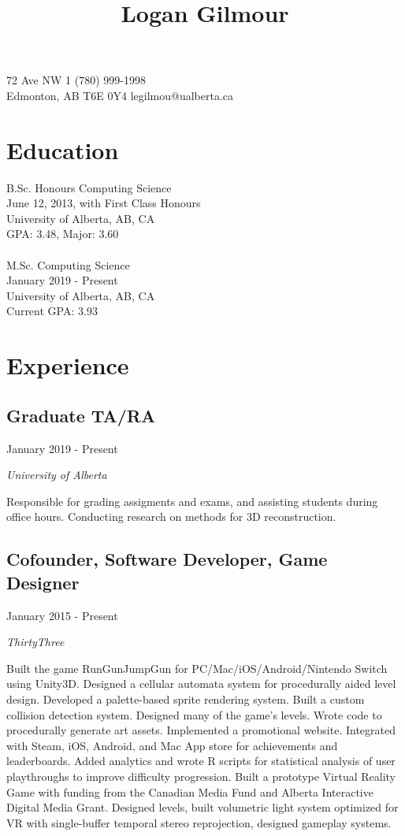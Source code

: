 \documentclass[10pt]{article}
\title{\bfseries\Large Logan Gilmour}
\author{}
\date{}
\begin{document}
\maketitle
{} 72 Ave NW \hfill 1 (780) 999-1998\\
Edmonton, AB  T6E 0Y4 \hfill legilmou@ualberta.ca
\section*{Education}

B.Sc. Honours Computing Science\\
June 12, 2013, with First Class Honours\\
University of Alberta, AB, CA\\
GPA: 3.48, Major: 3.60\\
\\
M.Sc. Computing Science\\
January 2019 - Present\\
University of Alberta, AB, CA\\
Current GPA: 3.93\\

\section*{Experience}

\subsection*{Graduate TA/RA}
January 2019 - Present

\emph{University of Alberta}
\vspace{\baselineskip}

Responsible for grading assigments and exams, and assisting students during office hours. Conducting research on methods for 3D reconstruction.


\subsection*{Cofounder, Software Developer, Game Designer}
January 2015 - Present

\emph{ThirtyThree}
\vspace{\baselineskip}

Built the game RunGunJumpGun for PC/Mac/iOS/Android/Nintendo Switch using Unity3D. Designed a cellular automata system for procedurally aided level design. Developed a palette-based sprite rendering system. Built a custom collision detection system. Designed many of the game's levels. Wrote code to procedurally generate art assets. Implemented a promotional website. Integrated with Steam, iOS, Android, and Mac App store for achievements and leaderboards. Added analytics and wrote R scripts for statistical analysis of user playthroughs to improve difficulty progression. Built a prototype Virtual Reality Game with funding from the Canadian Media Fund and Alberta Interactive Digital Media Grant. Designed levels, built volumetric light system optimized for VR with single-buffer temporal stereo reprojection, designed gameplay systems.
\end{document}
